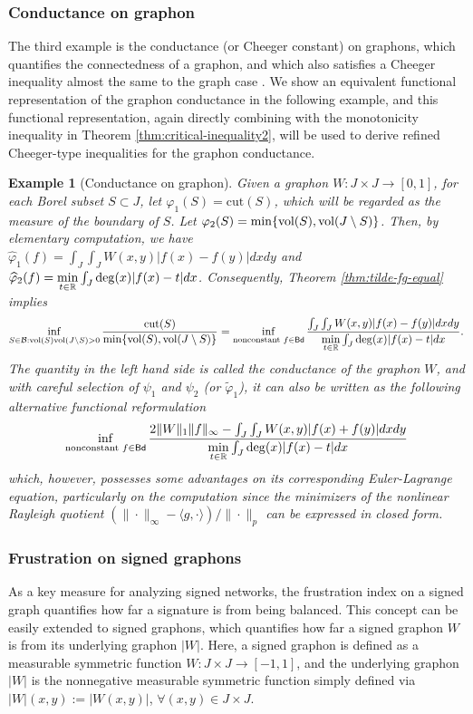\documentclass[12pt,a4paper]{article}
\newtheorem{example}[theorem]{Example}
\begin{document}
\subsubsection{Conductance on graphon}
The third example is the conductance (or Cheeger constant) on graphons, which quantifies the connectedness of a graphon, and which also satisfies a Cheeger inequality almost the same to the graph case \cite{KM24}. 
We show an equivalent functional representation of the graphon conductance in the following example, and this functional representation, again directly combining with the monotonicity inequality in Theorem \ref{thm:critical-inequality2}, will be used to derive refined Cheeger-type inequalities for the graphon conductance. 
\begin{example}[Conductance on graphon]\label{example:conductance-graphon}
Given a graphon $W:J\times J\to [0,1]$, for each Borel subset $S\subset J$, let $\varphi_1(S)=\mathrm{cut}(S)%
$, which will be regarded as the measure of the boundary of $S$. Let $\varphi_2(S)=\min\{\vol(S),\vol(J\setminus S)\}%
$. %
Then, by elementary computation, we have $\widehat{\varphi}_1(f)=\int_{J}\int_{J} W(x,y)|f(x)-f(y)|dxdy$ and $\widehat{\varphi}_2(f)=\min\limits_{t\in\mathbb{R}}\int_{J} \deg(x)|f(x)-t|dx$. Consequently, Theorem \ref{thm:tilde-fg-equal} implies 
$$ \inf_{S\in\mathcal{B}:\text{\rm vol}(S)\text{\rm vol}(J\setminus S)>0}\frac{\mathrm{cut}(S)}{\min\{\text{\rm vol}(S),\text{\rm vol}(J\setminus S)\}}=\inf_{\text{nonconstant }f\in {\sf Bd}}\frac{\int_J\int_JW(x,y)|f(x)-f(y)|dxdy}{\min\limits_{t\in\mathbb{R}}\int_{J} \deg(x)|f(x)-t|dx} .$$
The quantity in the left hand side is called the \emph{conductance} of the graphon $W$, %
and with careful selection of $\psi_1$ and $\psi_2$ (or $\widetilde{\varphi}_1$), it can also be written as the following alternative functional reformulation
$$ \inf_{\text{nonconstant }f\in {\sf Bd}}\frac{2\|W\|_1\|f\|_\infty-\int_J\int_JW(x,y)|f(x)+f(y)|dxdy}{\min\limits_{t\in\mathbb{R}}\int_{J} \deg(x)|f(x)-t|dx} $$
which, however, possesses some advantages on its corresponding Euler-Lagrange equation, particularly on the computation since the minimizers of the nonlinear Rayleigh quotient $(\|\cdot\|_\infty-\langle g,\cdot\rangle)/\|\cdot\|_p$ can be expressed in closed form. 
\end{example}


\subsubsection{Frustration on signed graphons}
As a key measure for analyzing signed networks, the frustration index on a signed graph quantifies how far a signature is from being balanced.  
This concept can be easily extended to  signed graphons, which quantifies how far a signed graphon $W$ is from its underlying graphon $|W|$. Here, a signed graphon is defined as  a measurable symmetric function $W: J\times J\to [-1,1]$, and the underlying graphon $|W|$ is the nonnegative measurable symmetric function simply defined via $|W|(x,y):=|W(x,y)|$, $\forall (x,y)\in J\times J$.
\end{document}
